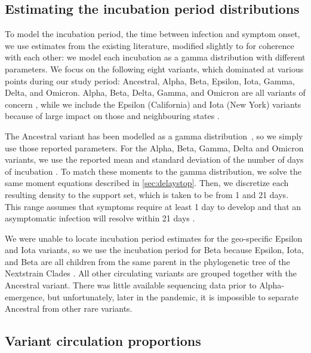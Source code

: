 \subsection{Estimating the incubation period distributions} 
\label{sec:incubation}

To model the incubation period, the time between infection and symptom onset, we
use estimates from the existing literature, modified slightly to for coherence
with each other: we model each incubation as a gamma distribution with different
parameters. We focus on the following eight variants, which dominated at various
points during our study period: Ancestral, Alpha, Beta, Epsilon, Iota, Gamma,
Delta, and Omicron. Alpha, Beta, Delta, Gamma, and Omicron are all variants of
concern \citep{who2021tracking}, while we include the Epsilon (California) and
Iota (New York) variants because of large impact on those and neighbouring
states \citep{yang2022investigation, duerr2021dominance}.

The Ancestral variant has been modelled as a gamma
distribution~\citep{tindale2020evidence}, so we simply use those reported
parameters. For the Alpha, Beta, Gamma, Delta and Omicron variants, we use the
reported mean and standard deviation of the number of days of incubation
\citep{tanaka2022shorter, grant2022impact, ogata2022shorter}. To match these
moments to the gamma distribution, we solve the same moment equations described
in \autoref{sec:delaystop}. Then, we discretize each resulting density to the support set,
which is taken to be from 1 and 21 days. This range assumes that symptoms
require at least 1 day to develop \citealp{phcan2021covid} and that an
asymptomatic infection will resolve within 21 days \citep{zaki2021estimations,cortes2022sars}.

We were unable to locate incubation period estimates
for the geo-specific Epsilon and Iota variants, so we use the
incubation period for Beta because Epsilon, Iota, and Beta are all children from
the same parent in the phylogenetic tree of the Nextstrain Clades
\citep{hodcroft2021covariants}. All other circulating variants are grouped
together with the Ancestral variant. There was little available sequencing data
prior to Alpha-emergence, but unfortunately, later in the pandemic, it is
impossible to separate Ancestral from other rare variants.


\subsection{Variant circulation proportions}
\label{sec:variant-proportions}

